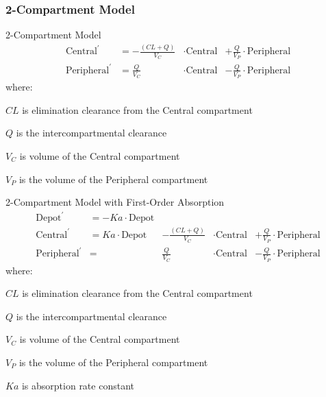 \subsubsection{2-Compartment Model}
\begin{frame}{2-Compartment Model}
    $$
        \begin{aligned}
            \text{Central}^{\prime}    & = -\frac{(CL + Q)}{V_C} & \cdot \text{Central} & + \frac{Q}{V_P} \cdot \text{Peripheral} \\
            \text{Peripheral}^{\prime} & =        \frac{Q}{V_C}  & \cdot \text{Central} & - \frac{Q}{V_P} \cdot \text{Peripheral}
        \end{aligned}
    $$
    where:
    \begin{vfilleditems}
        \item $CL$ is elimination clearance from the Central compartment
        \item $Q$ is the intercompartmental clearance
        \item $V_C$ is volume of the Central compartment
        \item $V_P$ is the volume of the Peripheral compartment
    \end{vfilleditems}
\end{frame}

\begin{frame}{2-Compartment Model with First-Order Absorption}
    $$
        \begin{aligned}
            \text{Depot}^{\prime}      & =        -Ka \cdot \text{Depot}                                                                                          \\
            \text{Central}^{\prime}    & =  Ka \cdot \text{Depot}        & -\frac{(CL + Q)}{V_C} & \cdot \text{Central} & + \frac{Q}{V_P} \cdot \text{Peripheral} \\
            \text{Peripheral}^{\prime} & =                               & \frac{Q}{V_C}         & \cdot \text{Central} & - \frac{Q}{V_P} \cdot \text{Peripheral}
        \end{aligned}
    $$
    where:
    \begin{vfilleditems}
        \item $CL$ is elimination clearance from the Central compartment
        \item $Q$ is the intercompartmental clearance
        \item $V_C$ is volume of the Central compartment
        \item $V_P$ is the volume of the Peripheral compartment
        \item $Ka$ is absorption rate constant
    \end{vfilleditems}
\end{frame}

